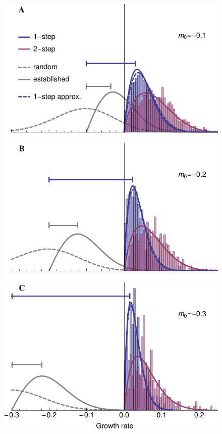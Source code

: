 \documentclass[9pt,twocolumn,twoside,lineno]{gsajnl}
\begin{document}
\begin{figure}[htbp]
\centering
\includegraphics[width=\linewidth]{2step_m2_smallm0_sims.pdf}\\
\includegraphics[width=\linewidth]{2step_m2_medm0_sims.pdf}\\
\includegraphics[width=\linewidth]{2step_m2_largem0_sims.pdf}

\end{figure}
\end{document}
